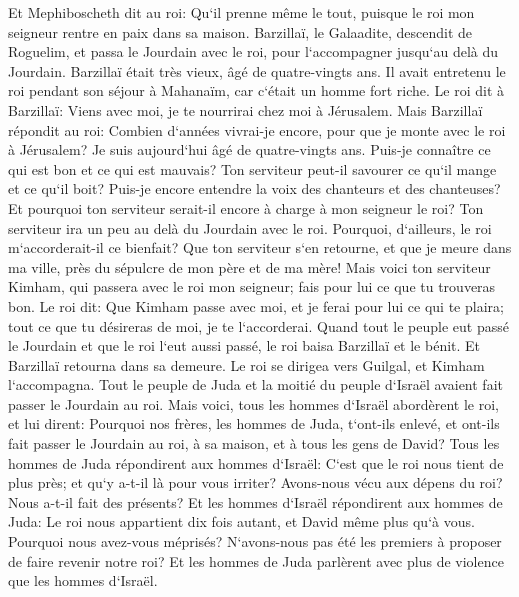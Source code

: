 \verse Et Mephiboscheth dit au roi: Qu`il prenne même le tout, puisque le roi mon seigneur rentre en paix dans sa maison. 
\verse Barzillaï, le Galaadite, descendit de Roguelim, et passa le Jourdain avec le roi, pour l`accompagner jusqu`au delà du Jourdain. 
\verse Barzillaï était très vieux, âgé de quatre-vingts ans. Il avait entretenu le roi pendant son séjour à Mahanaïm, car c`était un homme fort riche. 
\verse Le roi dit à Barzillaï: Viens avec moi, je te nourrirai chez moi à Jérusalem. 
\verse Mais Barzillaï répondit au roi: Combien d`années vivrai-je encore, pour que je monte avec le roi à Jérusalem? 
\verse Je suis aujourd`hui âgé de quatre-vingts ans. Puis-je connaître ce qui est bon et ce qui est mauvais? Ton serviteur peut-il savourer ce qu`il mange et ce qu`il boit? Puis-je encore entendre la voix des chanteurs et des chanteuses? Et pourquoi ton serviteur serait-il encore à charge à mon seigneur le roi? 
\verse Ton serviteur ira un peu au delà du Jourdain avec le roi. Pourquoi, d`ailleurs, le roi m`accorderait-il ce bienfait? 
\verse Que ton serviteur s`en retourne, et que je meure dans ma ville, près du sépulcre de mon père et de ma mère! Mais voici ton serviteur Kimham, qui passera avec le roi mon seigneur; fais pour lui ce que tu trouveras bon. 
\verse Le roi dit: Que Kimham passe avec moi, et je ferai pour lui ce qui te plaira; tout ce que tu désireras de moi, je te l`accorderai. 
\verse Quand tout le peuple eut passé le Jourdain et que le roi l`eut aussi passé, le roi baisa Barzillaï et le bénit. Et Barzillaï retourna dans sa demeure. 
\verse Le roi se dirigea vers Guilgal, et Kimham l`accompagna. Tout le peuple de Juda et la moitié du peuple d`Israël avaient fait passer le Jourdain au roi. 
\verse Mais voici, tous les hommes d`Israël abordèrent le roi, et lui dirent: Pourquoi nos frères, les hommes de Juda, t`ont-ils enlevé, et ont-ils fait passer le Jourdain au roi, à sa maison, et à tous les gens de David? 
\verse Tous les hommes de Juda répondirent aux hommes d`Israël: C`est que le roi nous tient de plus près; et qu`y a-t-il là pour vous irriter? Avons-nous vécu aux dépens du roi? Nous a-t-il fait des présents? 
\verse Et les hommes d`Israël répondirent aux hommes de Juda: Le roi nous appartient dix fois autant, et David même plus qu`à vous. Pourquoi nous avez-vous méprisés? N`avons-nous pas été les premiers à proposer de faire revenir notre roi? Et les hommes de Juda parlèrent avec plus de violence que les hommes d`Israël. 

\chapter{}

